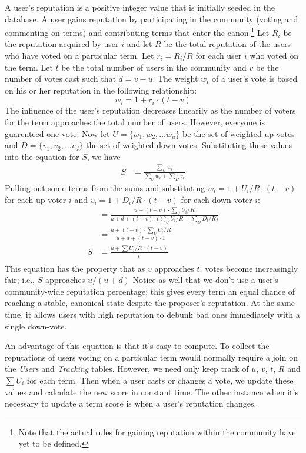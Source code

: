 \documentclass[letter]{article}
\newcounter{foot}
\begin{document}
A user's reputation is a positive integer value that is initially seeded in the database. A user gains 
reputation by participating in the community (voting and commenting on terms) and contributing 
terms that enter the canon.\footnote{Note that the actual rules for gaining reputation within 
the community have yet to be defined.} Let $R_i$ be the reputation acquired by user $i$ and let $R$ be the total reputation of the users 
who have voted on a particular term. Let $r_i = R_i / R$ for each user $i$ who voted on the 
term. Let $t$ be the total number of users in the community and $v$ be the number of votes cast 
such that $d = v - u$. The weight $w_i$ of a user's vote is based on his or her 
reputation in the following relationship: 
$$ w_i = 1 + r_i \cdot (t-v) $$
The influence of the user's reputation decreases linearily as the number of voters for the term
approaches the total number of users. However, everyone is guarenteed one vote.  
Now let $U = \{w_1, w_2, \dots w_u\}$ be the set of weighted up-votes and $D = \{v_1, v_2, \dots v_d\}$
the set of weighted down-votes. Substituting these values into the equation for $S$, we have
\begin{align*} 
S &= \frac{\sum_U{w_i}}{\sum_U{w_i} + \sum_D{v_i}}
\end{align*}
Pulling out some terms from the sums and substituting $w_i = 1 + U_i / R \cdot (t-v)$ for each up voter $i$ 
and $v_i = 1 + D_i / R \cdot (t-v)$ for each down voter $i$:
\begin{align*}
  &= \frac{u + (t - v) \cdot \sum_U{U_i/R}}{u + d + (t-v) \cdot \big( \sum_U{U_i/R} + \sum_D{D_i/R} \big)} \\
  &= \frac{u + (t - v) \cdot \sum_U{U_i/R}}{u + d + (t-v) \cdot 1} \\
S &= \frac{u + \sum{U_i/R} \cdot (t - v)}{t} \\
\end{align*}
This equation has the property that as $v$ approaches $t$, votes become increasingly fair; i.e., 
$S$ approaches $ u / (u + d)$
Notice as well that we don't use a user's community-wide reputation percentage; this gives every term an 
equal chance of reaching a stable, canonical state despite the proposer's reputation. At the same time, 
it allows users with high reputation to debunk bad ones immediately with a single down-vote. 

An advantage of this equation is that it's easy to compute. To collect the reputations of users voting
on a particular term would normally require a join on the \textit{Users} and \textit{Tracking} tables. 
However, we need only keep track of $u$, $v$, $t$, $R$ and $\sum{U_i}$ for each term. Then when a user
casts or changes a vote, we update these values and calculate the new score in constant time. The other
instance when it's necessary to update a term score is when a user's reputation changes.
\end{document}
